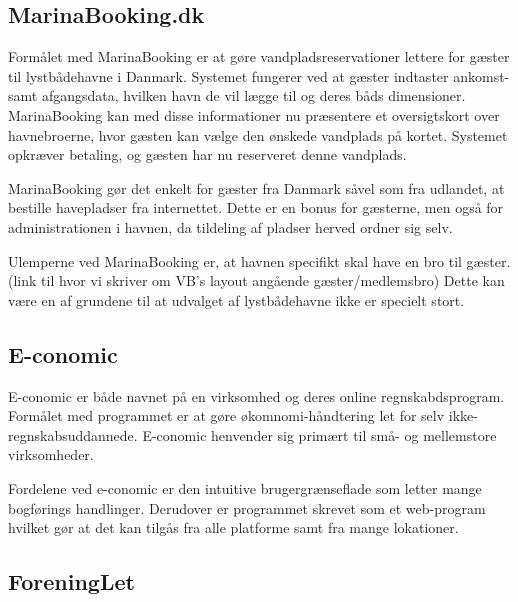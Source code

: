 \subsection{MarinaBooking.dk} %
\label{sub:MarinaBooking.dk}

Formålet med MarinaBooking \cite{marinabooking} er at gøre vandpladsreservationer lettere for gæster til lystbådehavne i Danmark. Systemet fungerer ved at gæster indtaster ankomst- samt afgangsdata, hvilken havn de vil lægge til og deres båds dimensioner. MarinaBooking kan med disse informationer nu præsentere et oversigtskort over havnebroerne, hvor gæsten kan vælge den ønskede vandplads på kortet. Systemet opkræver betaling, og gæsten har nu reserveret denne vandplads.

MarinaBooking gør det enkelt for gæster fra Danmark såvel som fra udlandet, at bestille havepladser fra internettet. Dette er en bonus for gæsterne, men også for administrationen i havnen, da tildeling af pladser herved ordner sig selv.

Ulemperne ved MarinaBooking er, at havnen specifikt skal have en bro til gæster. \sinote(link til hvor vi skriver om VB's layout angående gæster/medlemsbro) Dette kan være en af grundene til at udvalget af lystbådehavne ikke er specielt stort.


\subsection{E-conomic} %
\label{sub:E-conomic}

E-conomic er både navnet på en virksomhed og deres online regnskabdsprogram. Formålet med programmet er at gøre økomnomi-håndtering let for selv ikke-regnskabsuddannede. E-conomic henvender sig primært til små- og mellemstore virksomheder.

Fordelene ved e-conomic er den intuitive brugergrænseflade som letter mange bogførings handlinger. Derudover er programmet skrevet som et web-program hvilket gør at det kan tilgås fra alle platforme samt fra mange lokationer.


\subsection{ForeningLet} %
\label{sub:ForeningLet}


